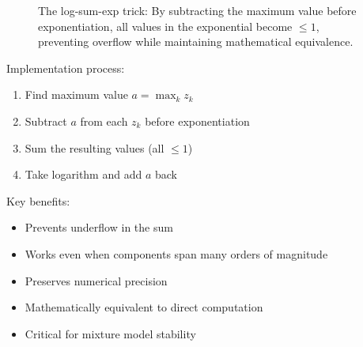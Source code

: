 \begin{figure}[htbp]
    \centering
    \caption{The log-sum-exp trick: By subtracting the maximum value before exponentiation, all values in the exponential become $\leq 1$, preventing overflow while maintaining mathematical equivalence.}
    \label{fig:log-sum-exp}
\end{figure}

Implementation process:
\begin{enumerate}
    \item Find maximum value $a = \max_k z_k$
    \item Subtract $a$ from each $z_k$ before exponentiation
    \item Sum the resulting values (all $\leq 1$)
    \item Take logarithm and add $a$ back
\end{enumerate}

Key benefits:
\begin{itemize}
    \item Prevents underflow in the sum
    \item Works even when components span many orders of magnitude
    \item Preserves numerical precision
    \item Mathematically equivalent to direct computation
    \item Critical for mixture model stability
\end{itemize}


